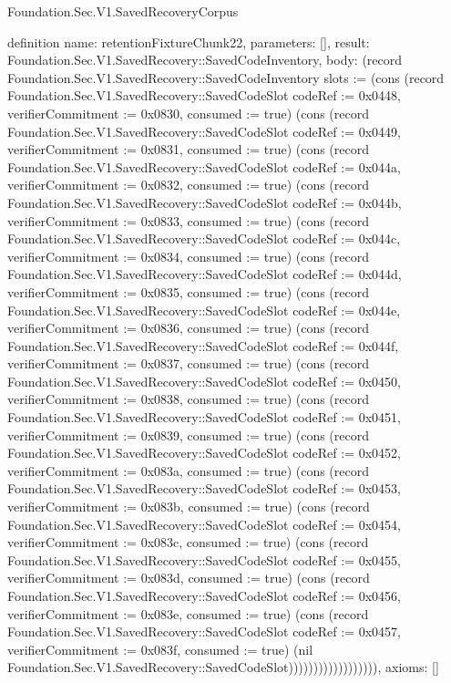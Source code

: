 \begin{lexlean}{Foundation.Sec.V1.SavedRecoveryCorpus}
\begin{semanticmodule}
definition{
  name: retentionFixtureChunk22,
  parameters: [],
  result: Foundation.Sec.V1.SavedRecovery::SavedCodeInventory,
  body: (record Foundation.Sec.V1.SavedRecovery::SavedCodeInventory {slots := (cons (record Foundation.Sec.V1.SavedRecovery::SavedCodeSlot {codeRef := 0x0448, verifierCommitment := 0x0830, consumed := true}) (cons (record Foundation.Sec.V1.SavedRecovery::SavedCodeSlot {codeRef := 0x0449, verifierCommitment := 0x0831, consumed := true}) (cons (record Foundation.Sec.V1.SavedRecovery::SavedCodeSlot {codeRef := 0x044a, verifierCommitment := 0x0832, consumed := true}) (cons (record Foundation.Sec.V1.SavedRecovery::SavedCodeSlot {codeRef := 0x044b, verifierCommitment := 0x0833, consumed := true}) (cons (record Foundation.Sec.V1.SavedRecovery::SavedCodeSlot {codeRef := 0x044c, verifierCommitment := 0x0834, consumed := true}) (cons (record Foundation.Sec.V1.SavedRecovery::SavedCodeSlot {codeRef := 0x044d, verifierCommitment := 0x0835, consumed := true}) (cons (record Foundation.Sec.V1.SavedRecovery::SavedCodeSlot {codeRef := 0x044e, verifierCommitment := 0x0836, consumed := true}) (cons (record Foundation.Sec.V1.SavedRecovery::SavedCodeSlot {codeRef := 0x044f, verifierCommitment := 0x0837, consumed := true}) (cons (record Foundation.Sec.V1.SavedRecovery::SavedCodeSlot {codeRef := 0x0450, verifierCommitment := 0x0838, consumed := true}) (cons (record Foundation.Sec.V1.SavedRecovery::SavedCodeSlot {codeRef := 0x0451, verifierCommitment := 0x0839, consumed := true}) (cons (record Foundation.Sec.V1.SavedRecovery::SavedCodeSlot {codeRef := 0x0452, verifierCommitment := 0x083a, consumed := true}) (cons (record Foundation.Sec.V1.SavedRecovery::SavedCodeSlot {codeRef := 0x0453, verifierCommitment := 0x083b, consumed := true}) (cons (record Foundation.Sec.V1.SavedRecovery::SavedCodeSlot {codeRef := 0x0454, verifierCommitment := 0x083c, consumed := true}) (cons (record Foundation.Sec.V1.SavedRecovery::SavedCodeSlot {codeRef := 0x0455, verifierCommitment := 0x083d, consumed := true}) (cons (record Foundation.Sec.V1.SavedRecovery::SavedCodeSlot {codeRef := 0x0456, verifierCommitment := 0x083e, consumed := true}) (cons (record Foundation.Sec.V1.SavedRecovery::SavedCodeSlot {codeRef := 0x0457, verifierCommitment := 0x083f, consumed := true}) (nil Foundation.Sec.V1.SavedRecovery::SavedCodeSlot)))))))))))))))))}),
  axioms: []
}


\end{semanticmodule}
\end{lexlean}

